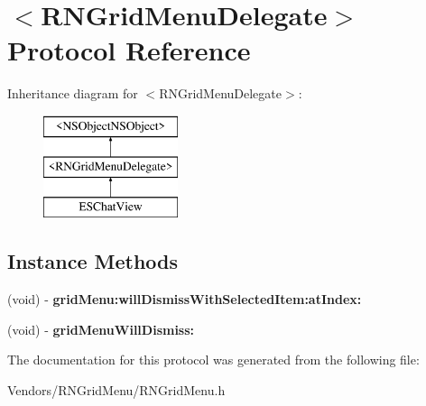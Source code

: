 \hypertarget{protocol_r_n_grid_menu_delegate-p}{}\section{$<$R\+N\+Grid\+Menu\+Delegate$>$ Protocol Reference}
\label{protocol_r_n_grid_menu_delegate-p}
Inheritance diagram for $<$R\+N\+Grid\+Menu\+Delegate$>$\+:\begin{figure}[H]
\begin{center}
\leavevmode
\includegraphics[height=3.000000cm]{protocol_r_n_grid_menu_delegate-p}
\end{center}
\end{figure}
\subsection*{Instance Methods}
\begin{DoxyCompactItemize}
\item 
\hypertarget{protocol_r_n_grid_menu_delegate-p_ac5b419513bda145db7d0468192b4ad6c}{}(void) -\/ {\bfseries grid\+Menu\+:will\+Dismiss\+With\+Selected\+Item\+:at\+Index\+:}\label{protocol_r_n_grid_menu_delegate-p_ac5b419513bda145db7d0468192b4ad6c}

\item 
\hypertarget{protocol_r_n_grid_menu_delegate-p_a989d0dbe537cba7f3eaaed760be86442}{}(void) -\/ {\bfseries grid\+Menu\+Will\+Dismiss\+:}\label{protocol_r_n_grid_menu_delegate-p_a989d0dbe537cba7f3eaaed760be86442}

\end{DoxyCompactItemize}


The documentation for this protocol was generated from the following file\+:\begin{DoxyCompactItemize}
\item 
Vendors/\+R\+N\+Grid\+Menu/R\+N\+Grid\+Menu.\+h\end{DoxyCompactItemize}
